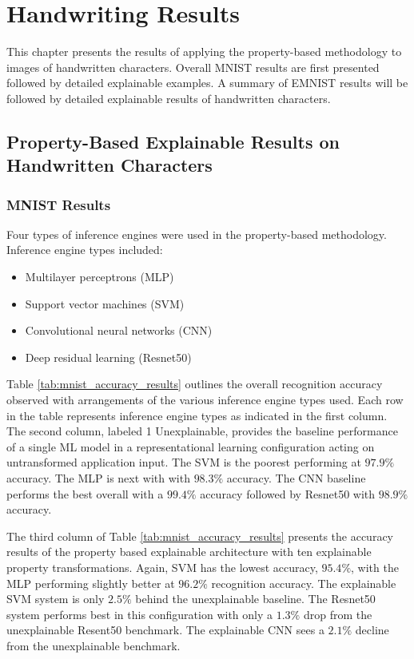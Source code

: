 \chapter{Handwriting Results} \label{ch:handwriting_results}

This chapter presents the results of applying the property-based methodology to
images of handwritten characters.  Overall MNIST results are first presented
followed by detailed explainable examples.  A summary of EMNIST results will be
followed by detailed explainable results of handwritten characters. 

\section{Property-Based Explainable Results on Handwritten Characters}

\subsection{MNIST Results}
\label{sec:mnist_results}

Four types of inference engines were used in the property-based methodology.
Inference engine types included:

\begin{itemize}
    \item Multilayer perceptrons (MLP)
    \item Support vector machines (SVM)
    \item Convolutional neural networks (CNN)
    \item Deep residual learning (Resnet50)
\end{itemize}

Table \ref{tab:mnist_accuracy_results} outlines the overall recognition accuracy
observed with arrangements of the various inference engine types used.  Each row
in the table represents inference engine types as indicated in the first column.
The second column, labeled 1 Unexplainable, provides the baseline performance of
a single ML model in a representational learning configuration acting on
untransformed application input.  The SVM is the poorest performing at $97.9\%$
accuracy. The MLP is next with with $98.3\%$ accuracy.  The CNN baseline performs the
best overall with a $99.4\%$ accuracy followed by Resnet50 with $98.9\%$ accuracy.

The third column of Table \ref{tab:mnist_accuracy_results} presents the accuracy
results of the property based explainable architecture with ten explainable
property transformations. Again, SVM has the lowest accuracy, $95.4\%$, with the
MLP performing slightly better at $96.2\%$ recognition accuracy.  The
explainable SVM system is only $2.5\%$ behind the unexplainable baseline.  The
Resnet50 system performs best in this configuration with only a $1.3\%$ drop
from the unexplainable Resent50 benchmark.  The explainable CNN sees a $2.1\%$
decline from the unexplainable benchmark.


